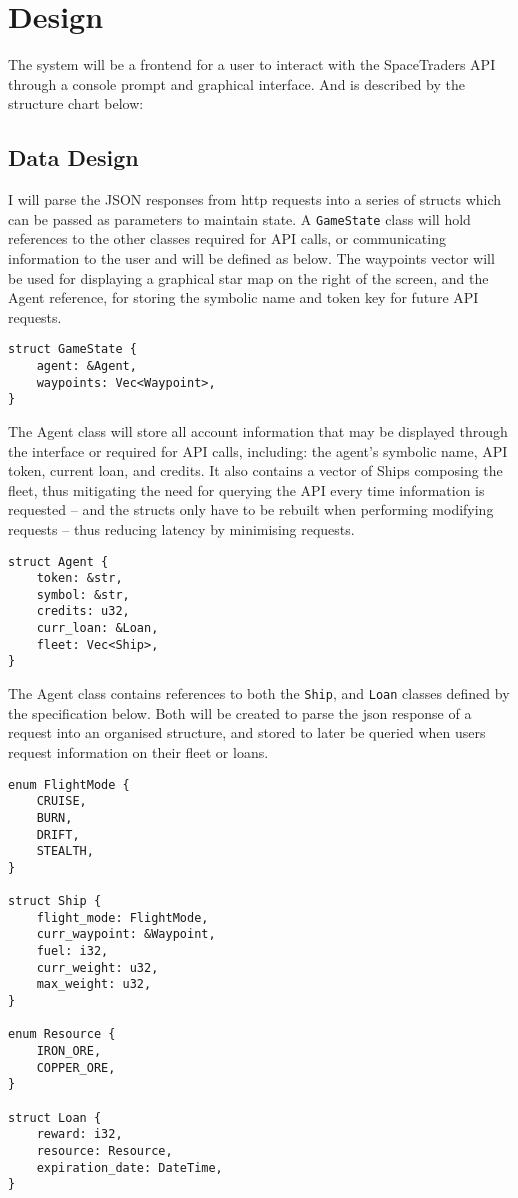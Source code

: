 \section{Design}
The system will be a frontend for a user to interact with the SpaceTraders API through a console prompt and graphical interface. And is described by the structure chart below:



\subsection{Data Design}
I will parse the JSON responses from http requests into a series of structs which can be passed as parameters to maintain state. A \texttt{GameState} class will hold references to the other classes required for API calls, or communicating information to the user and will be defined as below. The waypoints vector will be used for displaying a graphical star map on the right of the screen, and the Agent reference, for storing the symbolic name and token key for future API requests.
\begin{lstlisting}
struct GameState {
    agent: &Agent,
    waypoints: Vec<Waypoint>,
}
\end{lstlisting}

The Agent class will store all account information that may be displayed through the interface or required for API calls, including: the agent's symbolic name, API token, current loan, and credits. It also contains a vector of Ships composing the fleet, thus mitigating the need for querying the API every time information is requested – and the structs only have to be rebuilt when performing modifying requests – thus reducing latency by minimising requests.

\begin{lstlisting}
struct Agent {
    token: &str, 
    symbol: &str,
    credits: u32,
    curr_loan: &Loan,
    fleet: Vec<Ship>,
} 
\end{lstlisting}

The Agent class contains references to both the \texttt{Ship}, and \texttt{Loan} classes defined by the specification below. Both will be created to parse the json response of a request into an organised structure, and stored to later be queried when users request information on their fleet or loans.

\begin{lstlisting}
enum FlightMode {
    CRUISE,
    BURN,
    DRIFT,
    STEALTH,
}

struct Ship {
    flight_mode: FlightMode,
    curr_waypoint: &Waypoint,
    fuel: i32,
    curr_weight: u32,
    max_weight: u32,
}

enum Resource {
    IRON_ORE,
    COPPER_ORE,
}

struct Loan { 
    reward: i32,
    resource: Resource,
    expiration_date: DateTime,
}
\end{lstlisting}

